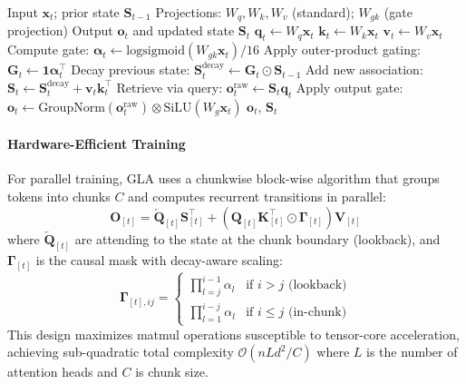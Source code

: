 \begin{algorithm}[H]
\caption{Gated Linear Attention (Recurrent Form)}
\begin{algorithmic}[1]
\Require Input $\mathbf{x}_t$; prior state $\mathbf{S}_{t-1}$
\Require Projections: $W_q, W_k, W_v$ (standard); $W_{gk}$ (gate projection)
\Ensure Output $\mathbf{o}_t$ and updated state $\mathbf{S}_t$
\State $\mathbf{q}_t \gets W_q \mathbf{x}_t$
\State $\mathbf{k}_t \gets W_k \mathbf{x}_t$
\State $\mathbf{v}_t \gets W_v \mathbf{x}_t$
\State Compute gate: $\boldsymbol{\alpha}_t \gets \text{logsigmoid}(W_{gk} \mathbf{x}_t) / 16$ 
\State Apply outer-product gating: $\mathbf{G}_t \gets \mathbf{1} \boldsymbol{\alpha}_t^\top$  
\State Decay previous state: $\mathbf{S}_t^\text{decay} \gets \mathbf{G}_t \odot \mathbf{S}_{t-1}$ 
\State Add new association: $\mathbf{S}_t \gets \mathbf{S}_t^\text{decay} + \mathbf{v}_t \mathbf{k}_t^\top$
\State Retrieve via query: $\mathbf{o}_t^\text{raw} \gets \mathbf{S}_t \mathbf{q}_t$
\State Apply output gate: $\mathbf{o}_t \gets \text{GroupNorm}(\mathbf{o}_t^\text{raw}) \otimes \text{SiLU}(W_g \mathbf{x}_t)$
\Return $\mathbf{o}_t$, $\mathbf{S}_t$
\end{algorithmic}
\end{algorithm}

\paragraph{Hardware-Efficient Training}

For parallel training, GLA uses a chunkwise block-wise algorithm that groups tokens into chunks $C$ and computes recurrent transitions in parallel:
\[
\mathbf{O}_{[t]} = \overleftarrow{\mathbf{Q}}_{[t]} \mathbf{S}_{[t]}^\top + \left(\mathbf{Q}_{[t]} \mathbf{K}_{[t]}^\top \odot \mathbf{\Gamma}_{[t]}\right) \mathbf{V}_{[t]}
\]
where $\overleftarrow{\mathbf{Q}}_{[t]}$ are attending to the state at the chunk boundary (lookback), and $\mathbf{\Gamma}_{[t]}$ is the causal mask with decay-aware scaling:
\[
\mathbf{\Gamma}_{[t],ij} = \begin{cases} \prod_{l=j}^{i-1} \alpha_l & \text{if } i > j \text{ (lookback)} \\ \prod_{l=1}^{i-j} \alpha_l & \text{if } i \le j \text{ (in-chunk)} \end{cases}
\]
This design maximizes matmul operations susceptible to tensor-core acceleration, achieving sub-quadratic total complexity $\mathcal{O}(nLd^2/C)$ where $L$ is the number of attention heads and $C$ is chunk size.

